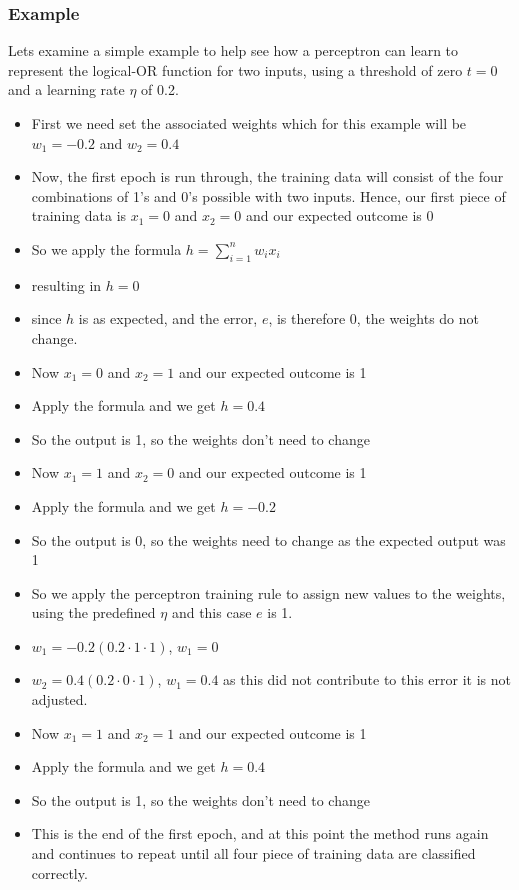 \subsubsection{Example}
Lets examine a simple example to help see how a perceptron can learn to represent the logical-OR function for two inputs, using a threshold of zero $t = 0$ and a learning rate $\eta$ of 0.2.
\begin{itemize}
    \item First we need set the associated weights which for this example will be $w_1 = -0.2$ and $w_2=0.4$
    \item Now, the first epoch is run through, the training data will consist of the four combinations of 1's and 0's possible with two inputs. Hence, our first piece of training data is $x_1 = 0$ and $x_2 = 0$ and our expected outcome is 0
    \item So we apply the formula $ h = \sum_{i=1}^{n} w_i x_i$
    \item resulting in $h = 0$
    \item since $h$ is as expected, and the error, $e$, is therefore 0, the weights do not change.
    \item Now $x_1 = 0$ and $x_2 =1$ and our expected outcome is 1
    \item Apply the formula and we get $h=0.4$
    \item So the output is 1, so the weights don't need to change
    \item Now $x_1 = 1$ and $x_2 =0$ and our expected outcome is 1
    \item Apply the formula and we get $h=-0.2$
    \item So the output is 0, so the weights need to change as the expected output was 1
    \item So we apply the perceptron training rule to assign new values to the weights, using the predefined $\eta$ and this case $e$ is 1.
    \item $w_1 = -0.2(0.2\cdot1\cdot1)$,  $w_1 = 0$
    \item $w_2 = 0.4(0.2\cdot0\cdot1)$,  $w_1 = 0.4$ as this did not contribute to this error it is not adjusted.
    \item Now $x_1 = 1$ and $x_2 =1$ and our expected outcome is 1
    \item Apply the formula and we get $h=0.4$
    \item So the output is 1, so the weights don't need to change
    \item This is the end of the first epoch, and at this point the method runs again and continues to repeat until all four piece of training data are classified correctly. 
\end{itemize}
